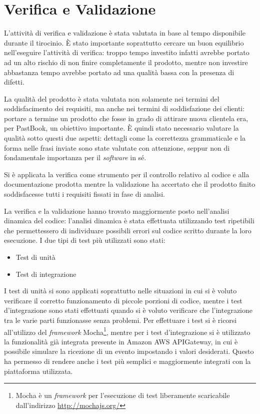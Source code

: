 
\chapter{Verifica e Validazione}

L'attività di verifica e validazione è stata valutata in base al tempo
disponibile durante il tirocinio. È stato importante soprattutto cercare un
buon equilibrio nell'eseguire l'attività di verifica: troppo tempo investito
infatti avrebbe portato ad un alto rischio di non finire completamente il
prodotto, mentre non investire abbastanza tempo avrebbe portato ad una qualità
bassa con la presenza di difetti.

La qualità del prodotto è stata valutata non solamente nei termini del
soddisfacimento dei requisiti, ma anche nei termini di soddisfazione dei
clienti: portare a termine un prodotto che fosse in grado di attirare nuova
clientela era, per PastBook, un obiettivo importante. È quindi stato necessario
valutare la qualità sotto questi due aspetti: dettagli come la correttezza
grammaticale e la forma nelle frasi inviate sono state valutate con attenzione,
seppur non di fondamentale importanza per il \textit{software} in sé.

Si è applicata la verifica come strumento per il controllo relativo
al codice e alla documentazione prodotta mentre la validazione ha accertato
che il prodotto finito soddisfacesse tutti i requisiti fissati in fase di
analisi.

La verifica e la validazione hanno trovato maggiormente posto nell'analisi
dinamica del codice: l'analisi dinamica è stata effettuata utilizzando test
ripetibili che permettessero di individuare possibili errori sul codice
scritto durante la loro esecuzione.
I due tipi di test più utilizzati sono stati:
\begin{itemize}
  \item Test di unità
  \item Test di integrazione
\end{itemize}
I test di unità si sono applicati soprattutto nelle situazioni in cui si è
voluto verificare il corretto funzionamento di piccole porzioni di codice,
mentre i test d'integrazione sono stati effettuati quando si è voluto
verificare che l'integrazione tra le varie parti funzionasse senza problemi.
Per effettuare i test si è ricorsi all'utilizzo del \textit{framework}
Mocha\footnote{Mocha è un \textit{framework} per l'esecuzione di test
liberamente scaricabile dall'indirizzo \url{http://mochajs.org/}},
mentre per i test d'integrazione si è utilizzato la funzionalità già integrata
presente in Amazon AWS APIGateway, in cui è possibile simulare la ricezione di
un evento impostando i valori desiderati. Questo ha permesso di rendere anche i
test più semplici e maggiormente integrati con la piattaforma utilizzata.

